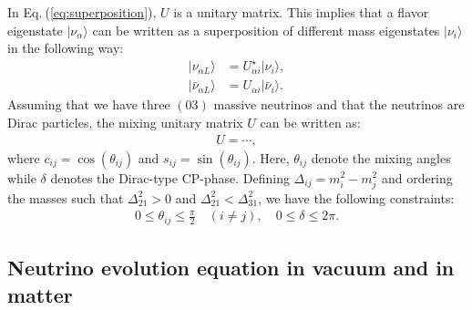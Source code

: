 \documentclass[twocolumn,secnumarabic,amssymb, nobibnotes, aps, prd,10pt]{revtex4-1}
\newcommand{\kt}[1]{\vert #1 \rangle}
\newcommand{\Eq}[1]{Eq.$\:$(\ref{#1})}
\begin{document}
In \Eq{eq:superposition}, $U$ is a unitary matrix. This implies that a flavor eigenstate
$\kt{\nu_\alpha}$ can be written as a superposition of different mass eigenstates $\kt{\nu_i}$
in the following way:
\begin{align}
\kt{\nu_{\alpha L}} &= U^\star_{\alpha i} \kt{\nu_i}, \\
\kt{\bar{\nu}_{\alpha L}} &= U_{\alpha i} \kt{\bar{\nu}_i}.
\end{align}
Assuming that we have three $(03)$ massive neutrinos and that the neutrinos are Dirac
particles, the mixing unitary matrix $U$ can be written as:
\begin{align}
U = \cdots ,
\label{eq:evolution_matrix}
\end{align}
where $c_{ij} = \cos(\theta_{ij})$ and $s_{ij} = \sin(\theta_{ij})$. Here, $\theta_{ij}$
denote the mixing angles while $\delta$ denotes the Dirac-type CP-phase. Defining 
$\Delta_{ij} = m_i^2 - m_j^2$ and ordering the masses such that $\Delta_{21}^2 > 0$
and $\Delta_{21}^2 < \Delta_{31}^2$, we have the following constraints:
\begin{align}
0 \leq \theta_{ij} \leq \frac{\pi}{2} \quad (i \neq j), \quad 0 \leq \delta \leq 2 \pi .
\end{align}


\subsection{Neutrino evolution equation in vacuum and in matter}
\label{subsec:evoleq}
\end{document}
